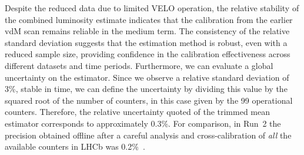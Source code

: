 Despite the reduced data due to limited VELO operation, the relative stability of the combined luminosity estimate indicates that the calibration from the earlier vdM scan remains reliable in the medium term. The consistency of the relative standard deviation suggests that the estimation method is robust, even with a reduced sample size, providing confidence in the calibration effectiveness across different datasets and time periods.
Furthermore, we can evaluate a global uncertainty on the estimator. Since we observe a relative standard deviation of 3\%, stable in time, we can define the uncertainty by dividing this value by the squared root of the number of counters, in this case given by the 99 operational counters. Therefore, the relative uncertainty quoted of the trimmed mean estimator corresponds to approximately 0.3\%. For comparison, in Run~2 the precision obtained offline after a careful analysis and cross-calibration of \textit{all} the available counters in LHCb was 0.2\%~\cite{lumi2}.